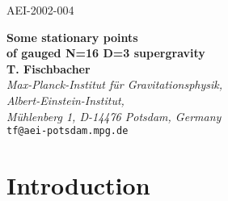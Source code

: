 \documentclass[a4paper,12pt]{article}
\begin{document}
\makeatletter
{}
\makeatother
\renewcommand{\theequation}{\thesection.\arabic{equation}}


\def\tr#1{\mbox{tr}\,#1}

\def\cosx#1{{\tt c}{\left(#1\right)}}
\def\coshx#1{{\tt K}{\left(#1\right)}}
\def\sinhx#1{{\tt S}{\left(#1\right)}}
\def\psip#1{\psi^+_{#1}}
\def\psim#1{\psi^-_{#1}}
\def\psipm#1{\psi^\pm_{#1}}

\thispagestyle{empty}
\begin{flushright}
AEI-2002-004
\end{flushright}

\begin{center}
{\bf\Large Some stationary points \\ of gauged N=16 D=3 supergravity}\\
\bigskip\bigskip\bigskip\bigskip
{\bf T. Fischbacher\medskip\\ }
{\em Max-Planck-Institut f\"ur Gravitationsphysik,\\
     Albert-Einstein-Institut,\\
     M\"uhlenberg 1, D-14476 Potsdam, Germany\\ }
\smallskip
{\small \tt tf@aei-potsdam.mpg.de}\bigskip

\end{center}

\begin{abstract}
\noindent Five nontrivial stationary points are found for maximal gauged N=16 supergravity in
three dimensions with gauge group $SO(8)\times SO(8)$ by restricting
the potential to a submanifold of the space of 
$SU(3)\subset\left(SO(8)\times SO(8)\right)_{\rm diag}$ singlets.
The construction
presented here uses the embedding of $E_{7(+7)}\subset E_{8(+8)}$ to
lift the analysis of $N=8, D=4$ supergravity performed by N. Warner to
$N=16, D=3$, and hence, these stationary points correspond to some of
the known extrema of gauged $N=8, D=4$ supergravity.
\end{abstract}

\vfill
{}

\newpage

\section{Introduction}
\end{document}
